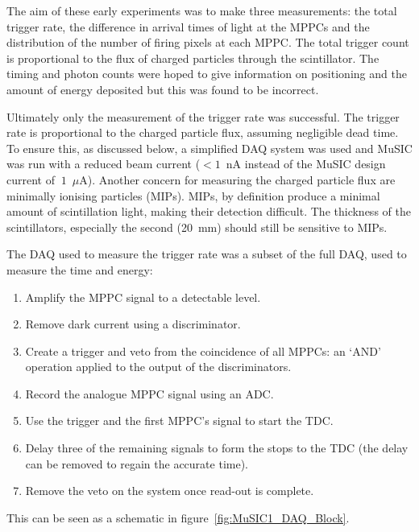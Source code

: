 The aim of these early experiments was to make three measurements: the total trigger rate, the difference in arrival times of light at the MPPCs and the distribution of the number of firing pixels at each MPPC. The total trigger count is proportional to the flux of charged particles through the scintillator. The timing and photon counts were hoped to give information on positioning and the amount of energy deposited but this was found to be incorrect.


Ultimately only the measurement of the trigger rate was successful. The trigger rate is proportional to the charged particle flux,  assuming negligible dead time. To ensure this, as discussed below, a simplified DAQ system was used and MuSIC was run with a reduced beam current (\(<1\)~nA instead of the MuSIC design current of \(~1\)~\(\mu\)A). Another concern for measuring the charged particle flux are minimally ionising particles (MIPs). MIPs, by definition produce a minimal amount of scintillation light, making their detection difficult. The thickness of the scintillators, especially the second (20~mm) should still be sensitive to MIPs.


The DAQ used to measure the trigger rate was a subset of the full DAQ, used to measure the time and energy:
\begin{enumerate}
  \item Amplify the MPPC signal to a detectable level.
  \item Remove dark current using a discriminator.
  \item Create a trigger and veto from the coincidence of all MPPCs: an `AND' operation applied to the output of the discriminators.
  \item Record the analogue MPPC signal using an ADC.
  \item Use the trigger and the first MPPC's signal to start the TDC.
  \item Delay three of the remaining signals to form the stops to the TDC (the delay can be removed to regain the accurate time).
  \item Remove the veto on the system once read-out is complete.
\end{enumerate}
This can be seen as a schematic in figure~\ref{fig:MuSIC1_DAQ_Block}. 

